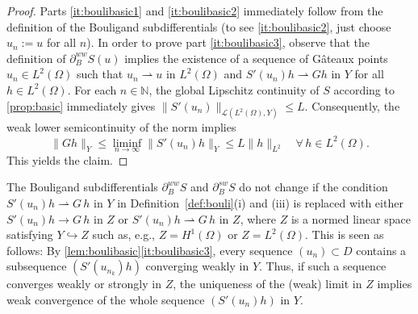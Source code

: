 \documentclass[reqno]{shinyart}
\begin{document}
\begin{proof}
    Parts \ref{it:boulibasic1} and \ref{it:boulibasic2} immediately follow from the 
    definition of the Bouligand subdifferentials (to see \ref{it:boulibasic2}, 
    just choose $u_n := u$ for all $n$). In order to prove part \ref{it:boulibasic3}, observe that 
    the definition of $\partial_{B}^{ww} S(u)$ implies the existence of 
    a sequence of G\^ateaux points $u_n \in L^2(\Omega)$ such that $u_n {\rightharpoonup} u$ in $L^2(\Omega)$ and 
    $S'(u_n)h {\rightharpoonup}  G h$ in $Y$ for all $h \in L^2(\Omega)$.  For each $n\in{\mathbb{N}}$, the 
    global Lipschitz continuity of $S$ according to \cref{prop:basic} 
    immediately gives $\|S'(u_n)\|_{{\mathcal{L}}(L^2(\Omega), Y)} \leq L$.
    Consequently, the weak lower semicontinuity of the norm implies
    \begin{equation*}
        \|Gh\|_{Y} \leq  \liminf_{n \to \infty} \|S'(u_n)h\|_{Y} \leq L \|h\|_{L^2} 
        \quad \forall \,h \in L^2(\Omega).
    \end{equation*}
    This yields the claim.
\end{proof}
\begin{remark}
    The Bouligand subdifferentials $\partial_B^{ww} S$ and $\partial_B^{sw} S$ do not change 
    if the condition $S'(u_n)h {\rightharpoonup} G\,h$ in $Y$ in Definition~\ref{def:bouli}(i) and (iii)
    is replaced with either $S'(u_n)h \to G\,h$ in $Z$ or $S'(u_n)h {\rightharpoonup} G\,h$ in $Z$, where $Z$ is a 
    normed linear space satisfying $Y {\hookrightarrow} Z$ such as, e.g., $Z = H^1(\Omega)$ 
    or $Z = L^2(\Omega)$. This is seen as follows:
    By \cref{lem:boulibasic}\ref{it:boulibasic3}, every sequence $(u_n) \subset D$ 
    contains a subsequence $(S'(u_{n_k})h)$ converging weakly in $Y$. 
    Thus, if such a sequence converges weakly or strongly in $Z$, the uniqueness of the (weak)
    limit in $Z$ implies weak convergence of the whole sequence $(S'(u_{n})h)$ in $Y$.
\end{remark}
\end{document}
